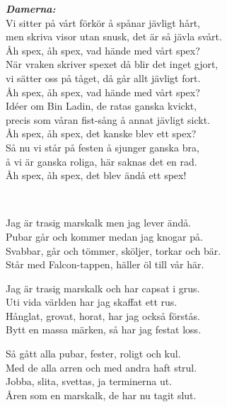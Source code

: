 \textbf{\textit{Damerna:}}\\
Vi sitter på vårt förkör å spånar jävligt hårt,\\
men skriva visor utan snusk, det är så jävla svårt.\\
\leftrepeat Åh spex, åh spex, vad hände med vårt spex? \rightrepeat\\
När vraken skriver spexet då blir det inget gjort,\\
vi sätter oss på tåget, då går allt jävligt fort.\\
\leftrepeat Åh spex, åh spex, vad hände med vårt spex? \rightrepeat\\
Idéer om Bin Ladin, de ratas ganska kvickt,\\
precis som våran fist-sång å annat jävligt sickt.\\
\leftrepeat Åh spex, åh spex, det kanske blev ett spex? \rightrepeat\\
Så nu vi står på festen å sjunger ganska bra,\\
å vi är ganska roliga, här saknas det en rad.\\
\leftrepeat Åh spex, åh spex, det blev ändå ett spex! \rightrepeat


\newpage 


 \\       
\author{Text: Martin Johnsson}

\songtext{}Jag är trasig marskalk men jag lever ändå.\\
Pubar går och kommer medan jag knogar på.\\
Svabbar, går och tömmer, sköljer, torkar och bär.\\
Står med Falcon-tappen, häller öl till vår här.

Jag är trasig marskalk och har capsat i grus.\\
Uti vida världen har jag skaffat ett rus.\\
Hånglat, grovat, horat, har jag också förstås.\\
Bytt en massa märken, så har jag festat loss.

Så gått alla pubar, fester, roligt och kul.\\
Med de alla arren och med andra haft strul.\\
Jobba, slita, svettas, ja terminerna ut.\\
Åren som en marskalk, de har nu tagit slut.

